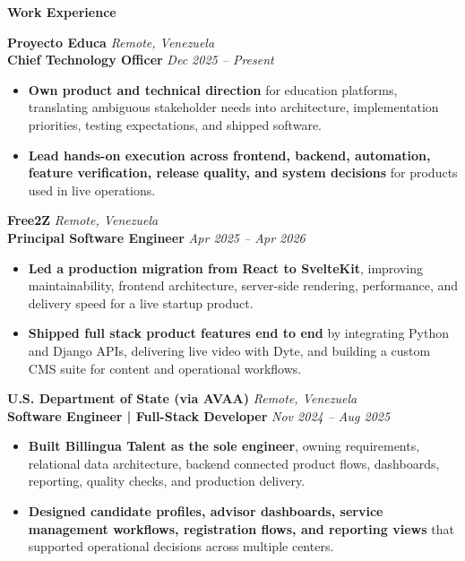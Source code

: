 \documentclass[11pt]{article}
\begin{document}
\vspace{7pt}
\begin{center}
    \textbf{Work Experience}
\end{center}
\vspace{-4pt}

\textbf{Proyecto Educa} \hfill \textit{Remote, Venezuela} \\
\textbf{Chief Technology Officer} \hfill \textit{Dec 2025 -- Present}
\begin{itemize}
    \item \textbf{Own product and technical direction} for education platforms, translating ambiguous stakeholder needs into architecture, implementation priorities, testing expectations, and shipped software.
    \item \textbf{Lead hands-on execution across frontend, backend, automation, feature verification, release quality, and system decisions} for products used in live operations.
\end{itemize}

\vspace{6pt}
\textbf{Free2Z} \hfill \textit{Remote, Venezuela} \\
\textbf{Principal Software Engineer} \hfill \textit{Apr 2025 -- Apr 2026}
\begin{itemize}
    \item \textbf{Led a production migration from React to SvelteKit}, improving maintainability, frontend architecture, server-side rendering, performance, and delivery speed for a live startup product.
    \item \textbf{Shipped full stack product features end to end} by integrating Python and Django APIs, delivering live video with Dyte, and building a custom CMS suite for content and operational workflows.
\end{itemize}

\vspace{6pt}
\textbf{U.S. Department of State (via AVAA)} \hfill \textit{Remote, Venezuela} \\
\textbf{Software Engineer | Full-Stack Developer} \hfill \textit{Nov 2024 -- Aug 2025}
\begin{itemize}
    \item \textbf{Built Billingua Talent as the sole engineer}, owning requirements, relational data architecture, backend connected product flows, dashboards, reporting, quality checks, and production delivery.
    \item \textbf{Designed candidate profiles, advisor dashboards, service management workflows, registration flows, and reporting views} that supported operational decisions across multiple centers.
\end{itemize}
\end{document}
